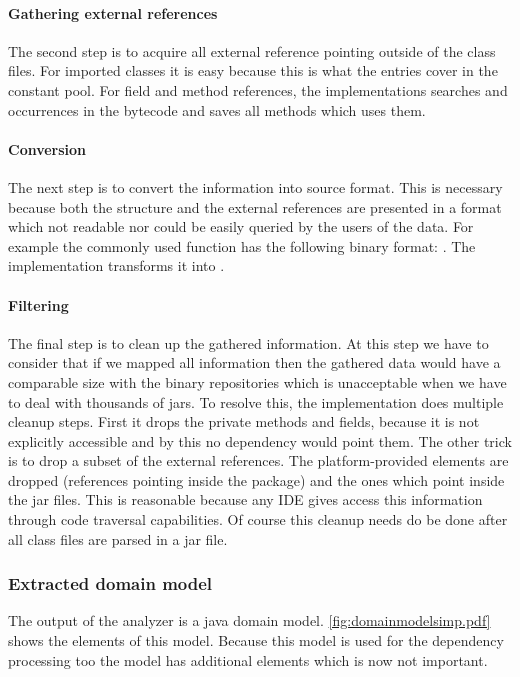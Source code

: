 \paragraph{Gathering external references}
The second step is to acquire all external reference pointing outside of the
class files. For imported classes it is easy because this is what the
 entries cover in the constant pool. For field and method
references, the implementations searches  and
 occurrences in the bytecode and saves all methods 
which uses them.

\paragraph{Conversion}
The next step is to convert the information into source format. This is
necessary because both the structure and the external references are presented
in a format which not readable nor could be easily queried by the users of the
data. For example the commonly used  function has the
following binary format: . The implementation
transforms it into .

\paragraph{Filtering}
The final step is to clean up the gathered information. At this step we have to
consider that if we mapped all information then the gathered data would have a
comparable size with the binary repositories which is unacceptable when we have
to deal with thousands of jars. To resolve this, the implementation does
multiple cleanup steps. First it drops the private methods and fields, because
it is not explicitly accessible and by this no dependency would point them. The
other trick is to drop a subset of the external references. The
platform-provided elements are dropped (references pointing inside the
 package) and the ones which point inside the jar files. This is
reasonable because any IDE gives access this information through code traversal
capabilities. Of course this cleanup needs do be done after all class files are 
parsed in a jar file. 


\subsubsection{Extracted domain model}
The output of the analyzer is a java domain model.
\autoref{fig:domainmodelsimp.pdf} shows the elements of this model. Because this
model is used for the dependency processing too the model has additional
elements which is now not important.

